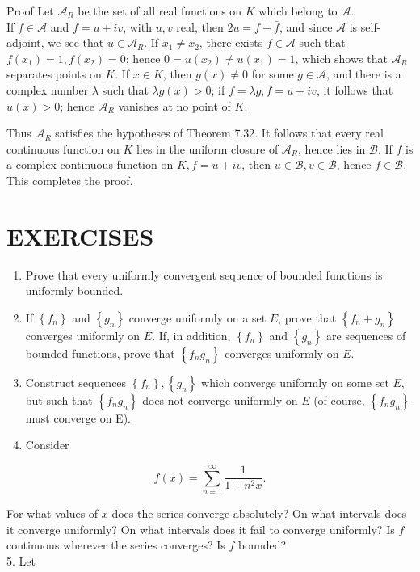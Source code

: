 \documentclass[10pt]{article}
\begin{document}
Proof Let $\mathscr{A}_{R}$ be the set of all real functions on $K$ which belong to $\mathscr{A}$.\\
If $f \in \mathscr{A}$ and $f=u+i v$, with $u, v$ real, then $2 u=f+\bar{f}$, and since $\mathscr{A}$ is self-adjoint, we see that $u \in \mathscr{A}_{R}$. If $x_{1} \neq x_{2}$, there exists $f \in \mathscr{A}$ such that $f\left(x_{1}\right)=1, f\left(x_{2}\right)=0$; hence $0=u\left(x_{2}\right) \neq u\left(x_{1}\right)=1$, which shows that $\mathscr{A}_{R}$ separates points on $K$. If $x \in K$, then $g(x) \neq 0$ for some $g \in \mathscr{A}$, and there is a complex number $\lambda$ such that $\lambda g(x)>0$; if $f=\lambda g, f=u+i v$, it follows that $u(x)>0$; hence $\mathscr{A}_{R}$ vanishes at no point of $K$.

Thus $\mathscr{A}_{R}$ satisfies the hypotheses of Theorem 7.32. It follows that every real continuous function on $K$ lies in the uniform closure of $\mathscr{A}_{R}$, hence lies in $\mathscr{B}$. If $f$ is a complex continuous function on $K, f=u+i v$, then $u \in \mathscr{B}, v \in \mathscr{B}$, hence $f \in \mathscr{B}$. This completes the proof.

\section*{EXERCISES}
\begin{enumerate}
  \item Prove that every uniformly convergent sequence of bounded functions is uniformly bounded.
  \item If $\left\{f_{n}\right\}$ and $\left\{g_{n}\right\}$ converge uniformly on a set $E$, prove that $\left\{f_{n}+g_{n}\right\}$ converges uniformly on $E$. If, in addition, $\left\{f_{n}\right\}$ and $\left\{g_{n}\right\}$ are sequences of bounded functions, prove that $\left\{f_{n} g_{n}\right\}$ converges uniformly on $E$.
  \item Construct sequences $\left\{f_{n}\right\},\left\{g_{n}\right\}$ which converge uniformly on some set $E$, but such that $\left\{f_{n} g_{n}\right\}$ does not converge uniformly on $E$ (of course, $\left\{f_{n} g_{n}\right\}$ must converge on E).
  \item Consider
\end{enumerate}

$$
f(x)=\sum_{n=1}^{\infty} \frac{1}{1+n^{2} x} .
$$

For what values of $x$ does the series converge absolutely? On what intervals does it converge uniformly? On what intervals does it fail to converge uniformly? Is $f$ continuous wherever the series converges? Is $f$ bounded?\\
5. Let
\end{document}
